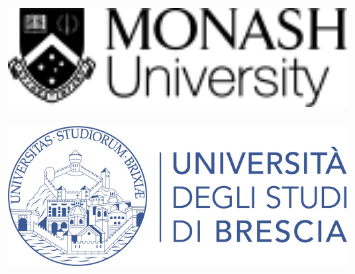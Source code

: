 \begin{frame}[plain]
    \titlepage
    \begin{minipage}{0.5\textwidth}
        \begin{figure}
            \centering
            \includegraphics[width=0.8\textwidth]{src/images/monash}
        \end{figure}
    \end{minipage}\hfill%
    \begin{minipage}{0.5\textwidth}
        \begin{figure}
            \centering
            \includegraphics[width=0.8\textwidth]{src/images/unibs}
        \end{figure}
    \end{minipage}%
\end{frame}